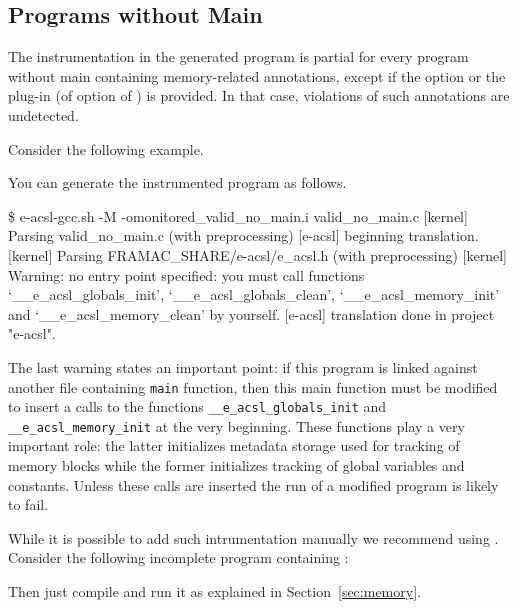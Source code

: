 \subsection{Programs without Main}
\label{sec:limits:no-main}

The instrumentation in the generated program is partial for every program
without main containing memory-related annotations, except if the option
 or the \eacsl plug-in (of 
option of \eacslgcc) is provided. In that case, violations of such annotations
are undetected.

Consider the following example.


You can generate the instrumented program as follows.
\begin{shell}
\$ e-acsl-gcc.sh -M -omonitored_valid_no_main.i valid_no_main.c
[kernel] Parsing valid_no_main.c (with preprocessing)
[e-acsl] beginning translation.
[kernel] Parsing FRAMAC_SHARE/e-acsl/e_acsl.h (with preprocessing)
[kernel] Warning: no entry point specified:
  you must call functions `__e_acsl_globals_init', `__e_acsl_globals_clean',
  `__e_acsl_memory_init' and `__e_acsl_memory_clean' by yourself.
[e-acsl] translation done in project "e-acsl".
\end{shell}

The last warning states an important point: if this program is linked against
another file containing \texttt{main} function, then this main function must
be modified to insert a calls to the functions
\texttt{\_\_e\_acsl\_globals\_init}
 and
\texttt{\_\_e\_acsl\_memory\_init}
 at the very
beginning. These functions play a very important role: the latter initializes
metadata storage used for tracking of memory blocks while the former initializes
tracking of global variables and constants. Unless these calls are inserted the
run of a modified program is likely to fail.

While it is possible to add such intrumentation manually we recommend using
\eacslgcc. Consider the following incomplete program containing :


Then just compile and run it as explained in Section~\ref{sec:memory}.

